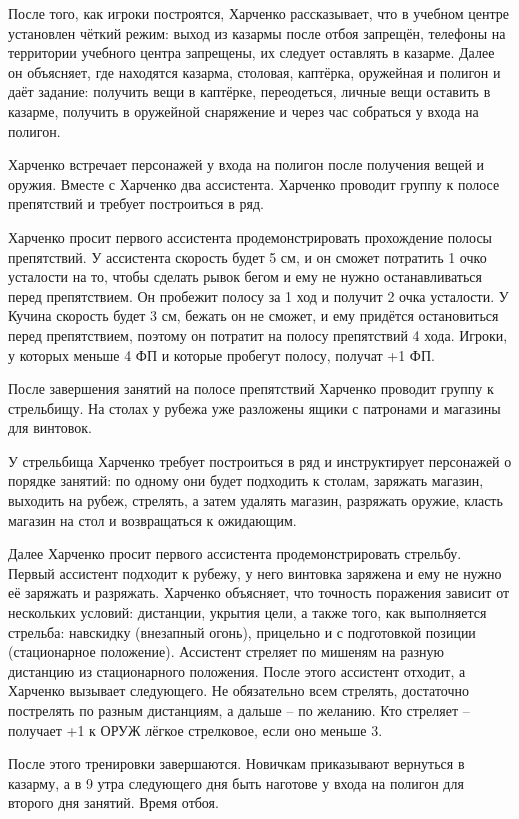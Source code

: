 \documentclass{article}
\begin{document}
После того, как игроки построятся, Харченко рассказывает, что в учебном
центре установлен чёткий режим: выход из казармы после отбоя запрещён,
телефоны на территории учебного центра запрещены, их следует оставлять в
казарме. Далее он объясняет, где находятся казарма, столовая, каптёрка,
оружейная и полигон и даёт задание: получить вещи в каптёрке,
переодеться, личные вещи оставить в казарме, получить в оружейной
снаряжение и через час собраться у входа на полигон.

Харченко встречает персонажей у входа на полигон после получения вещей и
оружия. Вместе с Харченко два ассистента. Харченко проводит группу к
полосе препятствий и требует построиться в ряд.

Харченко просит первого ассистента продемонстрировать прохождение полосы
препятствий. У ассистента скорость будет 5 см, и он сможет потратить 1
очко усталости на то, чтобы сделать рывок бегом и ему не нужно
останавливаться перед препятствием. Он пробежит полосу за 1 ход и
получит 2 очка усталости. У Кучина скорость будет 3 см, бежать он не
сможет, и ему придётся остановиться перед препятствием, поэтому он
потратит на полосу препятствий 4 хода. Игроки, у которых меньше 4 ФП и
которые пробегут полосу, получат +1 ФП.

После завершения занятий на полосе препятствий Харченко проводит группу
к стрельбищу. На столах у рубежа уже разложены ящики с патронами и
магазины для винтовок.

У стрельбища Харченко требует построиться в ряд и инструктирует
персонажей о порядке занятий: по одному они будет подходить к столам,
заряжать магазин, выходить на рубеж, стрелять, а затем удалять магазин,
разряжать оружие, класть магазин на стол и возвращаться к ожидающим.

Далее Харченко просит первого ассистента продемонстрировать стрельбу.
Первый ассистент подходит к рубежу, у него винтовка заряжена и ему не
нужно её заряжать и разряжать. Харченко объясняет, что точность
поражения зависит от нескольких условий: дистанции, укрытия цели, а
также того, как выполняется стрельба: навскидку (внезапный огонь),
прицельно и с подготовкой позиции (стационарное положение). Ассистент
стреляет по мишеням на разную дистанцию из стационарного положения.
После этого ассистент отходит, а Харченко вызывает следующего. Не
обязательно всем стрелять, достаточно пострелять по разным дистанциям, а
дальше -- по желанию. Кто стреляет -- получает +1 к ОРУЖ лёгкое
стрелковое, если оно меньше 3.

После этого тренировки завершаются. Новичкам приказывают вернуться в
казарму, а в 9 утра следующего дня быть наготове у входа на полигон для
второго дня занятий. Время отбоя.
\end{document}
